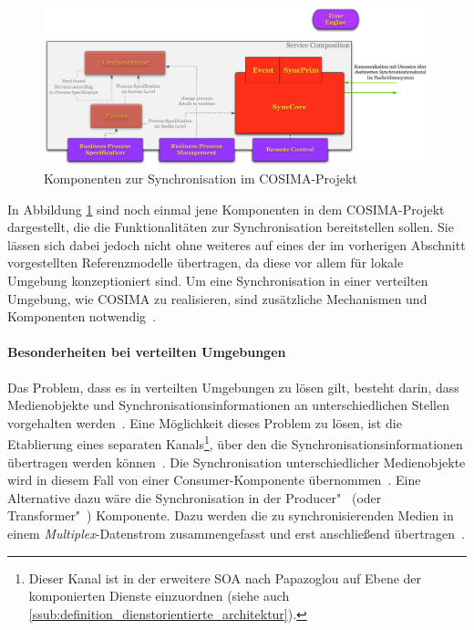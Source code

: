   
\label{msec:umsetzung_in_cosima}

  \begin{figure}[!ht]
    \centering
      \includegraphics[width=.9\textwidth]{images/Servicekomposition_syncpart.pdf}
    \caption{Komponenten zur Synchronisation im COSIMA-Projekt}
    \label{fig:images_Servicekomposition_syncpart}
  \end{figure}
  
  In Abbildung \ref{fig:images_Servicekomposition_syncpart} sind noch einmal jene Komponenten in dem COSIMA-Projekt dargestellt, die die Funktionalitäten zur Synchronisation bereitstellen sollen. Sie lässen sich dabei jedoch nicht ohne weiteres auf eines der im vorherigen Abschnitt vorgestellten Referenzmodelle übertragen, da diese vor allem für lokale Umgebung konzeptioniert sind. Um eine Synchronisation in einer verteilten Umgebung, wie COSIMA zu realisieren, sind zusätzliche Mechanismen und Komponenten notwendig~\citep[S. 608ff]{multimedia_technologie}. 
  
\paragraph{Besonderheiten bei verteilten Umgebungen} %
\label{par:besonderheiten_bei_verteilten_umgebungen}

  Das Problem, dass es in verteilten Umgebungen zu lösen gilt, besteht darin, dass Medienobjekte und Synchronisationsinformationen an unterschiedlichen Stellen vorgehalten werden~\citep[S. 607]{multimedia_technologie}. Eine Möglichkeit dieses Problem zu lösen, ist die Etablierung eines separaten Kanals\footnote{Dieser Kanal ist in der erweitere SOA nach Papazoglou auf Ebene der komponierten Dienste einzuordnen (siehe auch \ref{ssub:definition_dienstorientierte_architektur}).}, über den die Synchronisationsinformationen übertragen werden können~\citep[S. 608]{multimedia_technologie}. Die Synchronisation unterschiedlicher Medienobjekte wird in diesem Fall von einer Consumer-Komponente übernommen~\citep[S. 608]{multimedia_technologie}. Eine Alternative dazu wäre die Synchronisation in der Producer"~ (oder Transformer"~) Komponente. Dazu werden die zu synchronisierenden Medien in einem \emph{Multiplex}-Datenstrom zusammengefasst und erst anschließend übertragen~\citep[S. 609]{multimedia_technologie}.
  
